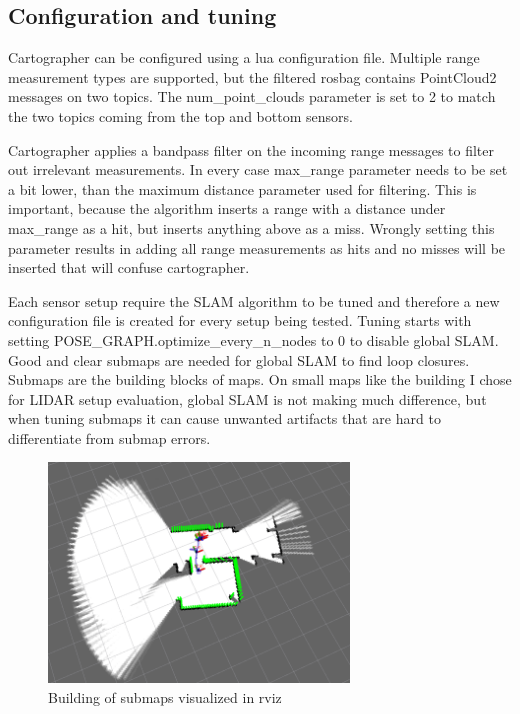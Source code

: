 \subsection{Configuration and tuning}
Cartographer can be configured using a lua configuration file. Multiple range measurement types are 
supported, but the filtered rosbag contains PointCloud2 messages on two topics. The num\_point\_clouds 
parameter is set to 2 to match the two topics coming from the top and bottom sensors. 

Cartographer applies a bandpass filter on the incoming range messages to filter out irrelevant 
measurements. In every case max\_range parameter needs to be set a bit lower, than the maximum distance
parameter used for filtering. This is important, because the algorithm inserts a range with a distance 
under max\_range as a hit, but inserts anything above as a miss. Wrongly setting this parameter results
in adding all range measurements as hits and no misses will be inserted that will confuse cartographer.

Each sensor setup require the SLAM algorithm to be tuned and therefore a new configuration file is 
created for every setup being tested. Tuning starts with setting POSE\_GRAPH.optimize\_every\_n\_nodes to
0 to disable global SLAM. Good and clear submaps are needed for global SLAM to find loop closures.
Submaps are the building blocks of maps. On small maps like the building I chose for LIDAR setup 
evaluation, global SLAM is not making much difference, but when tuning submaps it can cause unwanted
artifacts that are hard to differentiate from submap errors.

\begin{figure}[!ht]
    \centering
    \includegraphics[width=80mm, keepaspectratio]{figures/cartographer_submaps.png}
    \caption{Building of submaps visualized in rviz}
    \label{fig:cartographer_submap_building}
\end{figure}

